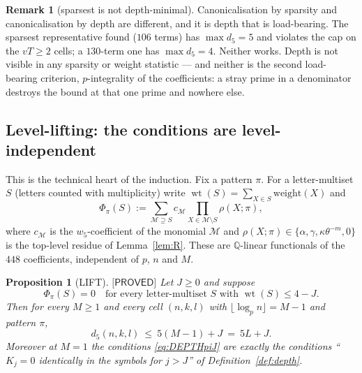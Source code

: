 \documentclass[11pt,reqno]{amsart}
\theoremstyle{plain}
\newtheorem{proposition}[theorem]{Proposition}
\theoremstyle{definition}
\newtheorem{remark}[theorem]{Remark}
\theoremstyle{remark}
\numberwithin{equation}{section}
\newcommand{\QQ}{\mathbb{Q}}
\newcommand{\wt}{\operatorname{wt}}
\newcommand{\Mcal}{\mathcal{M}}
\newcommand{\wfive}{w_5}
\newcommand{\PROVED}{\textsf{[PROVED]}}
\begin{document}
\begin{remark}[sparsest is not depth-minimal]
Canonicalisation by sparsity and canonicalisation by depth are different, and it is depth that
is load-bearing. The sparsest representative found ($106$ terms) has $\max d_5=5$ and violates
the cap on the $vT\ge2$ cells; a $130$-term one has $\max d_5=4$. Neither works. Depth is not
visible in any sparsity or weight statistic --- and neither is the second load-bearing
criterion, $p$-integrality of the coefficients: a stray prime in a denominator destroys the
bound at that one prime and nowhere else.
\end{remark}

\subsection{Level-lifting: the conditions are level-independent}

This is the technical heart of the induction. Fix a pattern $\pi$. For a letter-multiset $S$
(letters counted with multiplicity) write $\wt(S)=\sum_{X\in S}\text{weight}(X)$ and
\begin{equation}\label{eq:Phifunctional}
\Phi_\pi(S):=\sum_{\Mcal\supseteq S}c_\Mcal\prod_{X\in\Mcal\setminus S}\rho(X;\pi),
\end{equation}
where $c_\Mcal$ is the $\wfive$-coefficient of the monomial $\Mcal$ and
$\rho(X;\pi)\in\{\alpha,\gamma,\kappa\theta^{-m},0\}$ is the top-level residue of
Lemma~\ref{lem:R}. These are $\QQ$-linear functionals of the $448$ coefficients, independent of
$p$, $n$ and $M$.

\begin{proposition}[LIFT]\label{prop:LIFT}
$\PROVED$ Let $J\ge0$ and suppose
\begin{equation}\label{eq:DEPTHpiJ}
\Phi_\pi(S)=0\quad\text{for every letter-multiset $S$ with }\wt(S)\le4-J .
\end{equation}
Then for \emph{every} $M\ge1$ and every cell $(n,k,l)$ with $\lfloor\log_pn\rfloor=M-1$ and
pattern $\pi$,
\[
d_5(n,k,l)\ \le\ 5(M-1)+J\ =\ 5L+J .
\]
Moreover at $M=1$ the conditions \eqref{eq:DEPTHpiJ} are \emph{exactly} the conditions
``$K_j=0$ identically in the symbols for $j>J$'' of Definition~\textup{\ref{def:depth}}.
\end{proposition}
\end{document}
